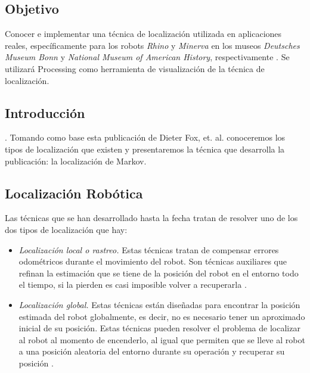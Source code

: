 \subsection{Objetivo}
Conocer e implementar una técnica de localización utilizada en aplicaciones reales, específicamente para los robots \textit{Rhino} y \textit{Minerva} en los museos \textit{Deutsches Museum Bonn} y \textit{National Museum of American History}, respectivamente \parencite{Dieter1999}. Se utilizará Processing como herramienta de visualización de la técnica de localización.

\subsection{Introducci\'on}

 \parencite{Dieter1999}. Tomando como base esta publicación de Dieter Fox, et. al. conoceremos los tipos de localización que existen y presentaremos la técnica que desarrolla la publicación: la localización de Markov.

\subsection{Localización Robótica}

Las técnicas que se han desarrollado hasta la fecha tratan de resolver uno de los dos tipos de localización que hay:

\begin{itemize}
  \item \textit{Localización local o rastreo.} Estas técnicas tratan de compensar errores odométricos durante el movimiento del robot. Son técnicas auxiliares que refinan la estimación que se tiene de la posición del robot en el entorno todo el tiempo, si la pierden es casi imposible volver a recuperarla \parencite{Dieter1999}.
  \item \textit{Localización global.} Estas técnicas están diseñadas para encontrar la posición estimada del robot globalmente, es decir, no es necesario tener un aproximado inicial de su posición. Estas técnicas pueden resolver el problema de localizar al robot al momento de encenderlo, al igual que permiten que se lleve al robot a una posición aleatoria del entorno durante su operación y recuperar su posición \parencite{Dieter1999}.
\end{itemize}

